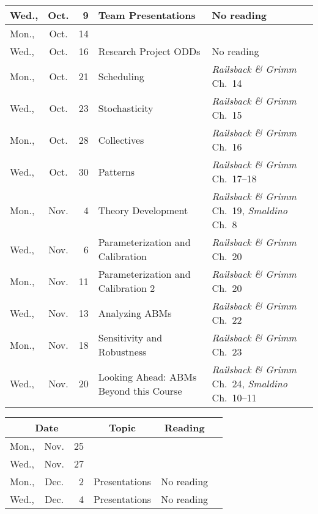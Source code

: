 \documentclass[11pt,twoside]{jgsyllabus}\usepackage[]{graphicx}\usepackage[]{xcolor}
\begin{document}
\begin{center}
\begin{tabular}{l@{~}c@{~}r>{\raggedright}m{2.6in}>{\centering}m{2in}c}
   \midrule
Wed., & Oct. &   9 & Team Presentations & No reading &  \\ 
   \midrule
Mon., & Oct. &  14 & \multicolumn{2}{l}{\bfseries\scshape\large Fall Break} & \\%
   \midrule
Wed., & Oct. &  16 & Research Project ODDs & No reading &  \\ 
   \midrule
Mon., & Oct. &  21 & Scheduling & \emph{Railsback \& Grimm\/} Ch.~14 &  \\ 
   \midrule
Wed., & Oct. &  23 & Stochasticity & \emph{Railsback \& Grimm\/} Ch.~15 &  \\ 
   \midrule
Mon., & Oct. &  28 & Collectives & \emph{Railsback \& Grimm\/} Ch.~16 &  \\ 
   \midrule
Wed., & Oct. &  30 & Patterns & \emph{Railsback \& Grimm\/} Ch.~17--18 &  \\ 
   \midrule
Mon., & Nov. &   4 & Theory Development & \emph{Railsback \& Grimm\/} Ch.~19, \emph{Smaldino\/} Ch.~8 &  \\ 
   \midrule
Wed., & Nov. &   6 & Parameterization and Calibration & \emph{Railsback \& Grimm\/} Ch.~20 &  \\ 
   \midrule
Mon., & Nov. &  11 & Parameterization and Calibration 2 & \emph{Railsback \& Grimm\/} Ch.~20 &  \\ 
   \midrule
Wed., & Nov. &  13 & Analyzing ABMs & \emph{Railsback \& Grimm\/} Ch.~22 &  \\ 
   \midrule
Mon., & Nov. &  18 & Sensitivity and Robustness & \emph{Railsback \& Grimm\/} Ch.~23 &  \\ 
   \midrule
Wed., & Nov. &  20 & Looking Ahead: ABMs Beyond this Course & \emph{Railsback \& Grimm\/} Ch.~24, \emph{Smaldino\/} Ch.~10--11 &  \\ 
   \bottomrule
\end{tabular}

\end{center}

\begin{center}
\begin{tabular}{l@{~}c@{~}r>{\raggedright}m{2.6in}>{\centering}m{2in}c}
  \toprule
  \multicolumn{3}{c}{\bfseries Date} & \multicolumn{1}{c}{\bfseries Topic} &\multicolumn{1}{c}{\bfseries Reading} &\\
 \midrule
Mon., & Nov. &  25 & \multicolumn{2}{l}{\multirow{3}{*}{\bfseries\scshape\Large Thanksgiving Break}} & \\%
  Wed., & Nov. &  27 &  &  &  \\ 
   \midrule
Mon., & Dec. &   2 & Presentations & No reading &  \\ 
   \midrule
Wed., & Dec. &   4 & Presentations & No reading &  \\ 
   \bottomrule
\end{tabular}

\end{center}
%
\end{document}

